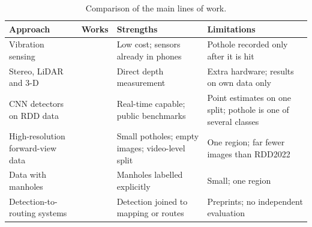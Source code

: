 \begin{table}[!htbp]
\centering
\small
\renewcommand{\arraystretch}{1.2}
\begin{tabular}{|L{2.9cm}|L{2.1cm}|L{3.8cm}|L{4.2cm}|}
\hline
\textbf{Approach} & \textbf{Works} & \textbf{Strengths} & \textbf{Limitations} \\
\hline
Vibration sensing & \cite{eriksson2008pothole,mednis2011real} & Low cost; sensors already in phones & Pothole recorded only after it is hit \\
\hline
Stereo, LiDAR and 3-D & \cite{fan2020pothole,kang2017pothole,dhiman2020pothole} & Direct depth measurement & Extra hardware; results on own data only \\
\hline
CNN detectors on RDD data & \cite{arya2020grddc,arya2022crddc,zeng2024yolov8pd} & Real-time capable; public benchmarks & Point estimates on one split; pothole is one of several classes \\
\hline
High-resolution forward-view data & \cite{chen2026hrp4k} & Small potholes; empty images; video-level split & One region; far fewer images than RDD2022 \\
\hline
Data with manholes & \cite{giordani2026roaddamage} & Manholes labelled explicitly & Small; one region \\
\hline
Detection-to-routing systems & \cite{balakuntala2013pothole,sahoo2025iwatchroadv2} & Detection joined to mapping or routes & Preprints; no independent evaluation \\
\hline
\end{tabular}
\caption{Comparison of the main lines of work.}
\label{tab:ch2-comparison}
\end{table}

